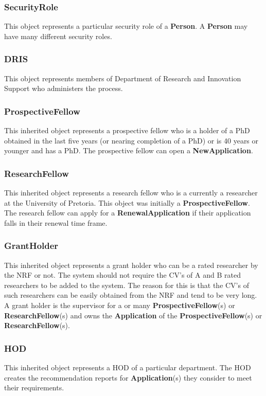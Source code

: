 \documentclass[12pt]{article}
\begin{document}
\subsubsection{SecurityRole}
This object represents a particular security role of a \textbf{Person}. A \textbf{Person} may have many different security roles.

\subsubsection{DRIS}
This object represents members of Department of Research and Innovation Support who administers the process.

\subsubsection{ProspectiveFellow}
This inherited object represents a prospective fellow who is a holder of a PhD obtained in the last five years (or nearing completion of a PhD) or is 40 years or younger and has a PhD. The prospective fellow can open a \textbf{NewApplication}.

\subsubsection{ResearchFellow}
This inherited object represents a research fellow who is a currently a researcher at the University of Pretoria. This object was initially a \textbf{ProspectiveFellow}. The research fellow can apply for a \textbf{RenewalApplication} if their application falls in their renewal time frame.

\subsubsection{GrantHolder}
This inherited object represents a grant holder who can be a rated researcher by the NRF or not. The system should not require the CV's of A and B rated researchers to be added to the system. The reason for this is that the CV's of such researchers can be easily obtained from the NRF and tend to be very long. A grant holder is the supervisor for a or many \textbf{ProspectiveFellow}(s) or \textbf{ResearchFellow}(s) and owns the \textbf{Application} of the \textbf{ProspectiveFellow}(s) or \textbf{ResearchFellow}(s).

\subsubsection{HOD}
This inherited object represents a HOD of a particular department. The HOD creates the recommendation reports for \textbf{Application}(s) they consider to meet their requirements.\\
\end{document}
